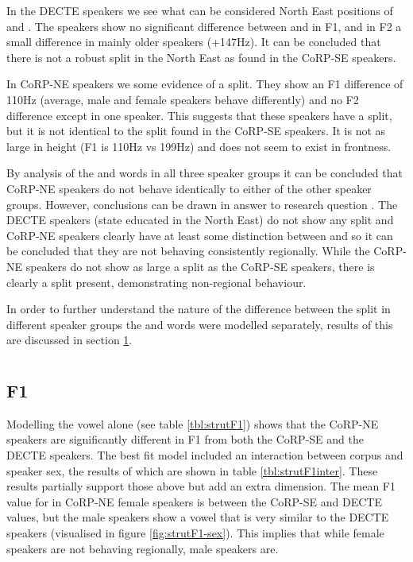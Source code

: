 \documentclass[../../../00.FullDoc/tex/ThesisSkeleton-draft2]{subfiles}
\begin{document}
In the DECTE speakers we see what can be considered  North East \FS{} positions of \foot{} and \strutt{}. The speakers show no significant difference between \foot{} and \strutt{} in F1, and in F2 a small difference in mainly older speakers (+147Hz). It can be concluded that there is not a robust \FS{} split in the North East as found in the CoRP-SE speakers.

In CoRP-NE speakers we some evidence of a split. They show an F1 difference of 110Hz (average, male and female speakers behave differently) and no F2 difference except in one speaker. This suggests that these speakers have a split, but it is not identical to the split found in the CoRP-SE speakers. It is not as large in height (F1 is 110Hz vs 199Hz) and does not seem to exist in frontness.

By analysis of the \foot{} and \strutt{} words in all three speaker groups it can be concluded that CoRP-NE speakers do not behave identically to either of the other speaker groups. However, conclusions can be drawn in answer to research question \notinsubfile{\ref{RQ1}}. The DECTE speakers (state educated in the North East) do not show any \FS{} split and CoRP-NE speakers clearly have at least some distinction between \foot{} and \strutt{} so it can be concluded that they are not behaving consistently regionally. While the CoRP-NE speakers do not show as large a split as the CoRP-SE speakers, there is clearly a split present, demonstrating non-regional behaviour.

In order to further understand the nature of the difference between the split in different speaker groups the \foot{} and \strutt{} words were modelled separately, results of this are discussed in section \ref{sec:FSSTRUT}.

\section{} \label{sec:FSSTRUT}
\subsection{F1}

Modelling the \strutt{} vowel alone (see table \ref{tbl:strutF1}) shows that the CoRP-NE speakers are significantly different in F1 from both the CoRP-SE and the DECTE speakers. The best fit model included an interaction between corpus and speaker sex, the results of which are shown in table \ref{tbl:strutF1inter}. These results partially support those above but add an extra dimension. The mean F1 value for \strutt{} in CoRP-NE female speakers is between the CoRP-SE and DECTE values, but the male speakers show a vowel that is very similar to the DECTE speakers (visualised in figure \ref{fig:strutF1-sex}). This implies that while female speakers are not behaving regionally, male speakers are.
\end{document}
